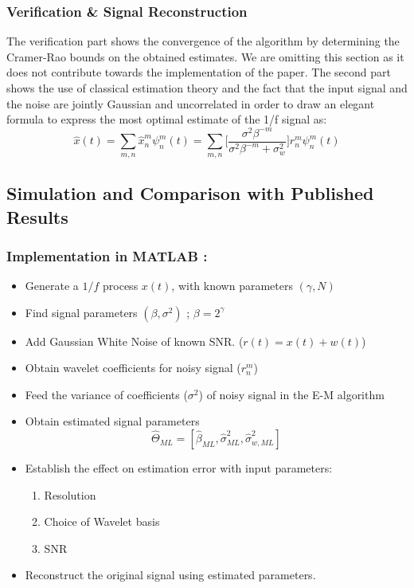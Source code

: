 \documentclass[a4paper]{article}
\begin{document}
\subsubsection{Verification \& Signal Reconstruction}
The verification part shows the convergence of the algorithm by determining the Cramer-Rao bounds on the obtained estimates. We are omitting this section as it does not contribute towards the implementation of the paper. 
The second part shows the use of classical estimation theory and the fact that the input signal and the noise are jointly Gaussian and uncorrelated in order to draw an elegant formula to express the most optimal estimate of the 1/f signal as:
$$ \hat{x}(t) = \sum _{m,n} \hat{x}_n^m \psi_n^m (t) = \sum _{m,n} \bigg [ \frac{\sigma^2 \beta^{-m}}{\sigma^2 \beta^{-m} + \sigma^2_w } \bigg ] r_n^m \psi_n^m (t)$$

\subsection{Simulation and Comparison with Published Results}
\subsubsection{Implementation in MATLAB :}
\begin{itemize}
\item Generate a $1/f$ process $x(t)$, with known parameters $(\gamma, N)$ 
\item Find signal parameters $(\beta , \sigma^2)$ ; $\beta = 2^\gamma $
\item Add Gaussian White Noise of known SNR.  ($r(t) = x(t) + w(t)$)
\item Obtain wavelet coefficients for noisy signal ($r_n^m$)
\item Feed the variance of coefficients ($\sigma ^2$) of noisy signal in the E-M algorithm 
\item Obtain estimated signal parameters $$ \hat{\Theta}_{ML} = [\hat{\beta}_{ML}, \hat{\sigma}^2_{ML} , \hat{\sigma}^2_{w, ML}]$$
\item Establish the effect on estimation error with input parameters:
\begin{enumerate}
\item Resolution
\item Choice of Wavelet basis
\item SNR
\end{enumerate}
\item Reconstruct the original signal using estimated parameters.
\end{itemize}
\end{document}
